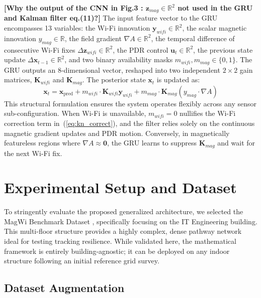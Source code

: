 \documentclass[conference]{IEEEtran}
\begin{document}
\textbf{\color{red}[Why the output of the CNN in Fig.3 : $\mathbf{z}_{mag} \in \mathbb{R}^2$ not used in the GRU and Kalman filter eq.(11)?]}
The input feature vector to the GRU encompasses 13 variables: the Wi-Fi innovation $\mathbf{y}_{wifi}  \in \mathbb{R}^2$, the scalar magnetic innovation $y_{mag}  \in \mathbb{R}$, the field gradient $\nabla A  \in \mathbb{R}^2$, the temporal difference of consecutive Wi-Fi fixes $\Delta \mathbf{z}_{wifi}  \in \mathbb{R}^2$, the PDR control $\mathbf{u}_t  \in \mathbb{R}^2$, the previous state update $\Delta \mathbf{x}_{t-1}  \in \mathbb{R}^2$, and two binary availability masks $m_{wifi}, m_{mag} \in \{0, 1\}$. The GRU outputs an 8-dimensional vector, reshaped into two independent $2\!\times\!2$ gain matrices, $\mathbf{K}_{wifi}$ and $\mathbf{K}_{mag}$. The posterior state $\mathbf{x}_t$ is updated as:
\begin{equation}
\mathbf{x}_t = \mathbf{x}_{\text{pred}} + m_{wifi} \cdot \mathbf{K}_{wifi} \mathbf{y}_{wifi} + m_{mag} \cdot \mathbf{K}_{mag} (y_{mag} \cdot \nabla A) \label{eq:kn_correct}
\end{equation}
This structural formulation ensures the system operates flexibly across any sensor sub-configuration. When Wi-Fi is unavailable, $m_{wifi} = 0$ nullifies the Wi-Fi correction term in~(\ref{eq:kn_correct}), and the filter relies solely on the continuous magnetic gradient updates and PDR motion. Conversely, in magnetically featureless regions where $\nabla A \approx \mathbf{0}$, the GRU learns to suppress $\mathbf{K}_{mag}$ and wait for the next Wi-Fi fix.

\section{Experimental Setup and Dataset}\label{sec:setup}

To stringently evaluate the proposed generalized architecture, we selected the MagWi Benchmark Dataset \cite{magwi}, specifically focusing on the IT Engineering building. This multi-floor structure provides a highly complex, dense pathway network ideal for testing tracking resilience. While validated here, the mathematical framework is entirely building-agnostic; it can be deployed on any indoor structure following an initial reference grid survey.

\subsection{Dataset Augmentation}
\end{document}
